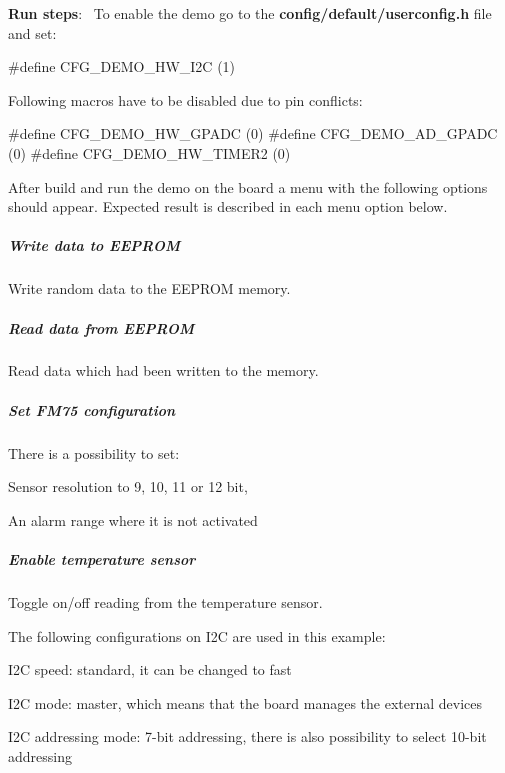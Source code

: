 \begin{DoxyItemize}
\item {\bfseries Run steps}\+:~\newline
 To enable the demo go to the {\bfseries {\ttfamily config/default/userconfig.\+h}} file and set\+: 
\begin{DoxyCode}
\textcolor{preprocessor}{#define CFG\_DEMO\_HW\_I2C         (1)}
\end{DoxyCode}
 Following macros have to be disabled due to pin conflicts\+: 
\begin{DoxyCode}
\textcolor{preprocessor}{#define CFG\_DEMO\_HW\_GPADC       (0)}
\textcolor{preprocessor}{#define CFG\_DEMO\_AD\_GPADC       (0)}
\textcolor{preprocessor}{#define CFG\_DEMO\_HW\_TIMER2      (0)}
\end{DoxyCode}
 After build and run the demo on the board a menu with the following options should appear. Expected result is described in each menu option below.
\end{DoxyItemize}

\subparagraph*{Write data to E\+E\+P\+R\+O\+M}

Write random data to the E\+E\+P\+R\+O\+M memory.

\subparagraph*{Read data from E\+E\+P\+R\+O\+M}

Read data which had been written to the memory.

\subparagraph*{Set F\+M75 configuration}

There is a possibility to set\+:
\begin{DoxyItemize}
\item Sensor resolution to 9, 10, 11 or 12 bit,
\item An alarm range where it is not activated
\end{DoxyItemize}

\subparagraph*{Enable temperature sensor}

Toggle on/off reading from the temperature sensor.

The following configurations on I2\+C are used in this example\+:
\begin{DoxyItemize}
\item I2\+C speed\+: standard, it can be changed to fast
\item I2\+C mode\+: master, which means that the board manages the external devices
\item I2\+C addressing mode\+: 7-\/bit addressing, there is also possibility to select 10-\/bit addressing
\end{DoxyItemize}

